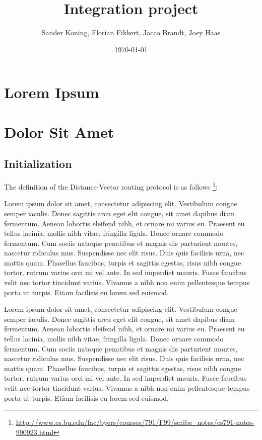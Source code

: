 \documentclass{article}
\author{Sander Koning, Florian Fikkert, Jacco Brandt, Joey Haas}
\date{\today}
\title{Integration project}
\begin{document}
	\maketitle
	\tableofcontents
	\newpage
	\section{Lorem Ipsum}
	\newpage
	\section{Dolor Sit Amet}
		\subsection{Initialization}
			The definition of the Distance-Vector routing protocol is as follows
			\footnote{\url{http://www.cs.bu.edu/fac/byers/courses/791/F99/scribe_notes/cs791-notes-990923.html}}:
			\begin{shaded}
				Lorem ipsum dolor sit amet, consectetur adipiscing elit. Vestibulum congue semper iaculis. Donec sagittis arcu eget elit congue, sit 					amet dapibus diam fermentum. Aenean lobortis eleifend nibh, et ornare mi varius eu. Praesent eu tellus lacinia, mollis nibh vitae, 					fringilla ligula. Donec ornare commodo fermentum. Cum sociis natoque penatibus et magnis dis parturient montes, nascetur ridiculus mus. 				Suspendisse nec elit risus. Duis quis facilisis urna, nec mattis quam. Phasellus faucibus, turpis et sagittis egestas, risus nibh congue 					tortor, rutrum varius orci mi vel ante. In sed imperdiet mauris. Fusce faucibus velit nec tortor tincidunt varius. Vivamus a nibh non 					enim pellentesque tempus porta ut turpis. Etiam facilisis eu lorem sed euismod.
			\end{shaded}

			Lorem ipsum dolor sit amet, consectetur adipiscing elit. Vestibulum congue semper iaculis. Donec sagittis arcu eget elit congue, sit amet dapibus diam fermentum. Aenean lobortis eleifend nibh, et ornare mi varius eu. Praesent eu tellus lacinia, mollis nibh vitae, fringilla ligula. Donec ornare commodo fermentum. Cum sociis natoque penatibus et magnis dis parturient montes, nascetur ridiculus mus. Suspendisse nec elit risus. Duis quis facilisis urna, nec mattis quam. Phasellus faucibus, turpis et sagittis egestas, risus nibh congue tortor, rutrum varius orci mi vel ante. In sed imperdiet mauris. Fusce faucibus velit nec tortor tincidunt varius. Vivamus a nibh non enim pellentesque tempus porta ut turpis. Etiam facilisis eu lorem sed euismod.
\end{document}
